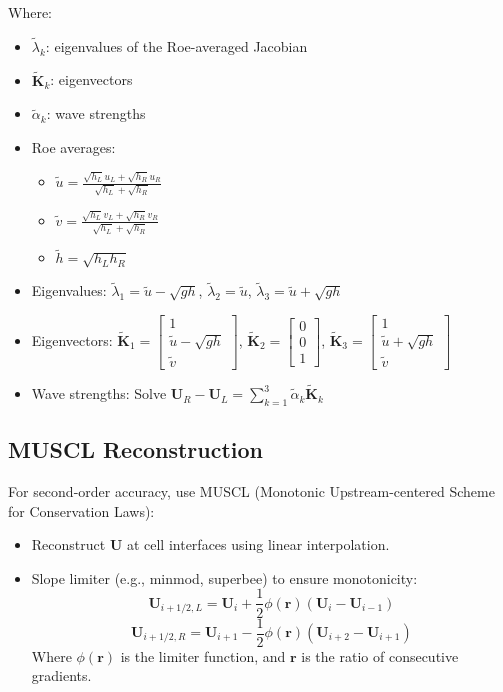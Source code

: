 \documentclass[a4paper,12pt]{article}
\begin{document}
Where:
\begin{itemize}
    \item \(\tilde{\lambda}_k\): eigenvalues of the Roe-averaged Jacobian
    \item \(\tilde{\mathbf{K}}_k\): eigenvectors
    \item \(\tilde{\alpha}_k\): wave strengths
    \item Roe averages:
    \begin{itemize}
        \item \(\tilde{u} = \frac{\sqrt{h_L}u_L + \sqrt{h_R}u_R}{\sqrt{h_L} + \sqrt{h_R}}\)
        \item \(\tilde{v} = \frac{\sqrt{h_L}v_L + \sqrt{h_R}v_R}{\sqrt{h_L} + \sqrt{h_R}}\)
        \item \(\tilde{h} = \sqrt{h_L h_R}\)
    \end{itemize}
    \item Eigenvalues: \(\tilde{\lambda}_1 = \tilde{u} - \sqrt{gh}\), \(\tilde{\lambda}_2 = \tilde{u}\), \(\tilde{\lambda}_3 = \tilde{u} + \sqrt{gh}\)
    \item Eigenvectors: \(\tilde{\mathbf{K}}_1 = \begin{bmatrix} 1 \\ \tilde{u} - \sqrt{gh} \\ \tilde{v} \end{bmatrix}\), \(\tilde{\mathbf{K}}_2 = \begin{bmatrix} 0 \\ 0 \\ 1 \end{bmatrix}\), \(\tilde{\mathbf{K}}_3 = \begin{bmatrix} 1 \\ \tilde{u} + \sqrt{gh} \\ \tilde{v} \end{bmatrix}\)
    \item Wave strengths: Solve \(\mathbf{U}_R - \mathbf{U}_L = \sum_{k=1}^3 \tilde{\alpha}_k \tilde{\mathbf{K}}_k\)
\end{itemize}

\subsection*{MUSCL Reconstruction}
For second-order accuracy, use MUSCL (Monotonic Upstream-centered Scheme for Conservation Laws):
\begin{itemize}
    \item Reconstruct \(\mathbf{U}\) at cell interfaces using linear interpolation.
    \item Slope limiter (e.g., minmod, superbee) to ensure monotonicity:
    \[
    \mathbf{U}_{i+1/2,L} = \mathbf{U}_i + \frac{1}{2} \phi(\mathbf{r}) (\mathbf{U}_i - \mathbf{U}_{i-1})
    \]
    \[
    \mathbf{U}_{i+1/2,R} = \mathbf{U}_{i+1} - \frac{1}{2} \phi(\mathbf{r}) (\mathbf{U}_{i+2} - \mathbf{U}_{i+1})
    \]
    Where \(\phi(\mathbf{r})\) is the limiter function, and \(\mathbf{r}\) is the ratio of consecutive gradients.
\end{itemize}
\end{document}
